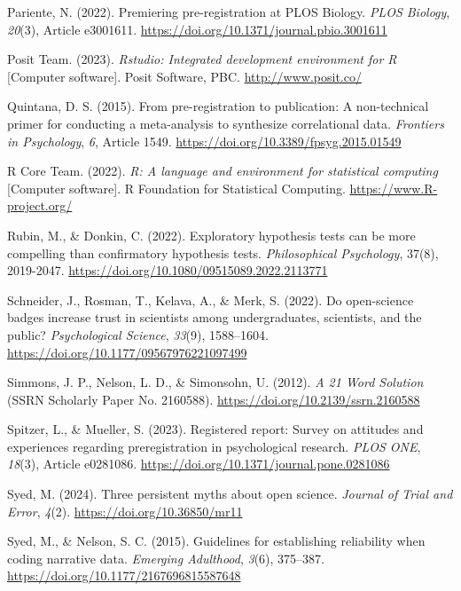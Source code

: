 \documentclass[authordate, empirical]{jote-new-article}
\begin{document}
	Pariente, N. (2022). Premiering pre-registration at PLOS Biology. \emph{PLOS Biology}, \emph{20}(3), Article e3001611. \url{https://doi.org/10.1371/journal.pbio.3001611}



	Posit Team. (2023). \emph{Rstudio: Integrated development environment for R} [Computer software]. Posit Software, PBC. \url{http://www.posit.co/}



	Quintana, D. S. (2015). From pre-registration to publication: A non-technical primer for conducting a meta-analysis to synthesize correlational data. \emph{Frontiers in Psychology}, \emph{6}, Article 1549. \url{https://doi.org/10.3389/fpsyg.2015.01549}



	R Core Team. (2022). \emph{R: A language and environment for statistical computing} [Computer software]. R Foundation for Statistical Computing. \url{https://www.R-project.org/}



	Rubin, M., \& Donkin, C. (2022). Exploratory hypothesis tests can be more compelling than confirmatory hypothesis tests. \emph{Philosophical Psychology}, 37(8), 2019-2047. \url{https://doi.org/10.1080/09515089.2022.2113771}



	Schneider, J., Rosman, T., Kelava, A., \& Merk, S. (2022). Do open-science badges increase trust in scientists among undergraduates, scientists, and the public? \emph{Psychological Science}, \emph{33}(9), 1588--1604. \url{https://doi.org/10.1177/09567976221097499}



	Simmons, J. P., Nelson, L. D., \& Simonsohn, U. (2012). \emph{A 21 Word Solution} (SSRN Scholarly Paper No. 2160588). \url{https://doi.org/10.2139/ssrn.2160588}



	Spitzer, L., \& Mueller, S. (2023). Registered report: Survey on attitudes and experiences regarding preregistration in psychological research. \emph{PLOS ONE}, \emph{18}(3), Article e0281086. \url{https://doi.org/10.1371/journal.pone.0281086}



	Syed, M. (2024). Three persistent myths about open science. \emph{Journal of Trial and Error}, \emph{4}(2). \url{https://doi.org/10.36850/mr11}



	Syed, M., \& Nelson, S. C. (2015). Guidelines for establishing reliability when coding narrative data. \emph{Emerging Adulthood}, \emph{3}(6), 375--387. \url{https://doi.org/10.1177/2167696815587648}
\end{document}
